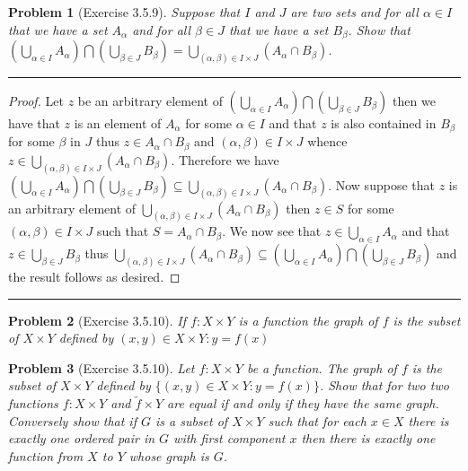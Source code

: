\documentclass{article}
\newcommand{\lined}{\noindent\rule{\textwidth}{1pt}}
\newtheorem*{problem}{Problem}
\begin{document}
	\newpage
	
	\begin{problem}[Exercise 3.5.9]
		Suppose that $I$ and $J$ are two sets and for all $\alpha \in I$ that we have a set $A_{\alpha}$ and for all $\beta \in J$ that we have a set $B_{\beta}$. Show that $(\bigcup_{\alpha \in I}A_{\alpha}) \bigcap (\bigcup_{\beta \in J}B_{\beta}) = 
		\bigcup_{(\alpha,\beta) \in I \times J}(A_{\alpha} \cap B_{\beta})$.
	\end{problem}
	
	\lined
	\begin{proof}
		Let $z$ be an arbitrary element of $(\bigcup_{\alpha \in I}A_{\alpha}) \bigcap (\bigcup_{\beta \in J}B_{\beta})$ then we have that 
		$z$ is an element of $A_{\alpha}$ for some $\alpha \in I$ and that $z$ is also contained in $B_{\beta}$ for some $\beta$ in $J$ thus $z \in A_{\alpha} \cap B_{\beta}$ and $(\alpha,\beta) \in I \times J$ whence $z \in \bigcup_{(\alpha,\beta) \in I \times J}(A_{\alpha} \cap B_{\beta})$. Therefore we have $(\bigcup_{\alpha \in I}A_{\alpha}) \bigcap (\bigcup_{\beta \in J}B_{\beta}) \subseteq	\bigcup_{(\alpha,\beta) \in I \times J}(A_{\alpha} \cap B_{\beta})$. Now suppose that $z$ is an arbitrary element of
		$\bigcup_{(\alpha,\beta) \in I \times J}(A_{\alpha} \cap B_{\beta})$ then $z \in S$ for some $(\alpha,\beta) \in I \times J$ such
		that $S = A_{\alpha} \cap B_{\beta}$. We now see that $z \in \bigcup_{\alpha \in I} A_{\alpha}$ and that $z \in \bigcup_{\beta \in J} B_{\beta}$ thus $\bigcup_{(\alpha,\beta) \in I \times J}(A_{\alpha} \cap B_{\beta}) \subseteq (\bigcup_{\alpha \in I}A_{\alpha}) \bigcap (\bigcup_{\beta \in J}B_{\beta})$ and the result follows as desired.
		
	\end{proof}
	\lined
	
	\newpage
	
	\begin{problem}[Exercise 3.5.10]
		If $f:X \times Y$ is a function the graph of $f$ is the subset of $X \times Y$  defined by $(x,y) \in X \times Y: y = f(x)$
	\end{problem}
	
	\newpage
	
	\begin{problem}[Exercise 3.5.10]
		Let $f:X \times Y$ be a function. The graph of $f$
		is the subset of $X \times Y$ defined by 
		$\{(x,y) \in X \times Y:y = f(x)\}$. Show that for two 
		two functions $f:X \times Y$ and $\tilde{f} \times Y
		$ are equal if and only if they have the same graph.
		Conversely show that if $G$ is a subset of $X \times Y$ such that for each $x \in X$ there is exactly one ordered pair in $G$ with first component $x$ then there is exactly one function from $X$ to $Y$ whose graph is $G$.
	\end{problem}
	
\end{document}
